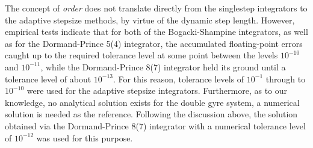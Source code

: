%
%
The concept of \emph{order} does not translate directly from the
singlestep integrators to the adaptive stepsize methods, by virtue of the
dynamic step length. However, empirical tests indicate that for both of the
Bogacki-Shampine integrators, as well as for the Dormand-Prince 5(4) integrator,
the accumulated floating-point errors caught up to the required tolerance level
at some point between the levels $10^{-10}$ and $10^{-11}$, while the
Dormand-Prince 8(7) integrator held its ground until a tolerance level of about
$10^{-13}$. For this reason, tolerance levels of $10^{-1}$ through to $10^{-10}$
were used for the adaptive stepsize integrators. Furthermore, as to our
knowledge, no analytical solution exists for the double gyre system, a numerical
solution is needed as the reference. Following the discussion above, the
solution obtained via the Dormand-Prince 8(7) integrator with a numerical
tolerance level of $10^{-12}$ was used for this purpose.

